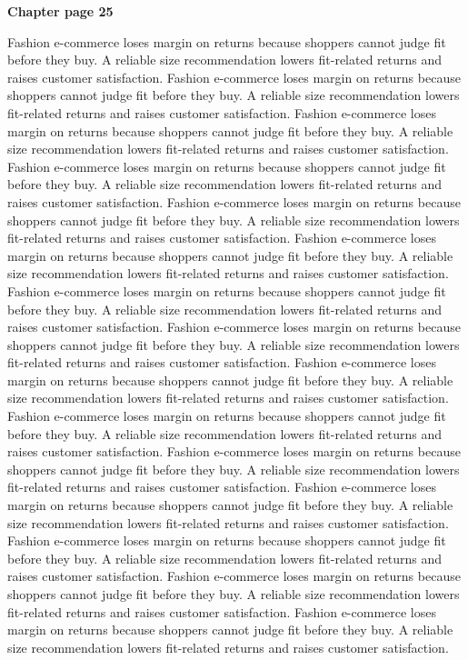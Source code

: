 \documentclass[a4paper,11pt]{article}
\begin{document}
{\headfont\bfseries\Large Chapter page 25}\par\medskip
Fashion e-commerce loses margin on returns because shoppers cannot judge fit before they buy. A reliable size recommendation lowers fit-related returns and raises customer satisfaction. Fashion e-commerce loses margin on returns because shoppers cannot judge fit before they buy. A reliable size recommendation lowers fit-related returns and raises customer satisfaction. Fashion e-commerce loses margin on returns because shoppers cannot judge fit before they buy. A reliable size recommendation lowers fit-related returns and raises customer satisfaction. Fashion e-commerce loses margin on returns because shoppers cannot judge fit before they buy. A reliable size recommendation lowers fit-related returns and raises customer satisfaction. Fashion e-commerce loses margin on returns because shoppers cannot judge fit before they buy. A reliable size recommendation lowers fit-related returns and raises customer satisfaction. 
Fashion e-commerce loses margin on returns because shoppers cannot judge fit before they buy. A reliable size recommendation lowers fit-related returns and raises customer satisfaction. Fashion e-commerce loses margin on returns because shoppers cannot judge fit before they buy. A reliable size recommendation lowers fit-related returns and raises customer satisfaction. Fashion e-commerce loses margin on returns because shoppers cannot judge fit before they buy. A reliable size recommendation lowers fit-related returns and raises customer satisfaction. Fashion e-commerce loses margin on returns because shoppers cannot judge fit before they buy. A reliable size recommendation lowers fit-related returns and raises customer satisfaction. Fashion e-commerce loses margin on returns because shoppers cannot judge fit before they buy. A reliable size recommendation lowers fit-related returns and raises customer satisfaction. 
Fashion e-commerce loses margin on returns because shoppers cannot judge fit before they buy. A reliable size recommendation lowers fit-related returns and raises customer satisfaction. Fashion e-commerce loses margin on returns because shoppers cannot judge fit before they buy. A reliable size recommendation lowers fit-related returns and raises customer satisfaction. Fashion e-commerce loses margin on returns because shoppers cannot judge fit before they buy. A reliable size recommendation lowers fit-related returns and raises customer satisfaction. Fashion e-commerce loses margin on returns because shoppers cannot judge fit before they buy. A reliable size recommendation lowers fit-related returns and raises customer satisfaction. Fashion e-commerce loses margin on returns because shoppers cannot judge fit before they buy. A reliable size recommendation lowers fit-related returns and raises customer satisfaction. \newpage
\end{document}
